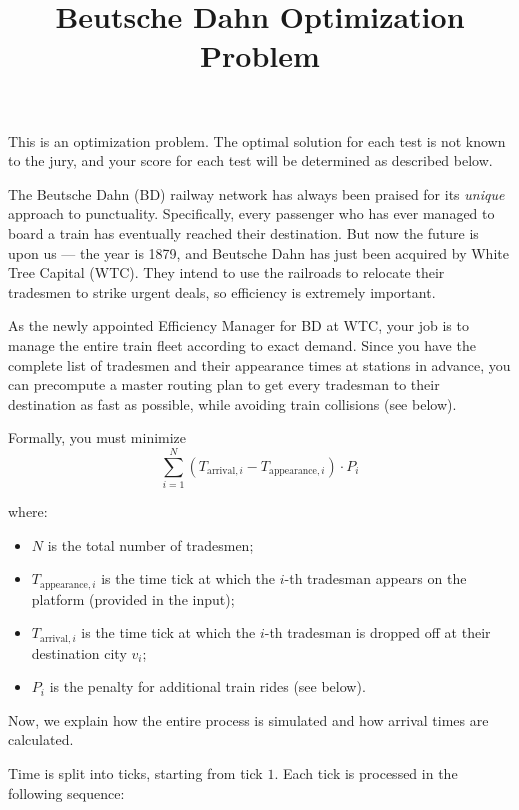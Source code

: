 \documentclass[11pt]{article}
\title{Beutsche Dahn Optimization Problem}
\date{}
\begin{document}
\maketitle

This is an optimization problem. The optimal solution for each test is not known to the jury, and your score for each test will be determined as described below.

The Beutsche Dahn (BD) railway network has always been praised for its \emph{unique} approach to punctuality. Specifically, every passenger who has ever managed to board a train has eventually reached their destination. But now the future is upon us --- the year is 1879, and Beutsche Dahn has just been acquired by White Tree Capital (WTC). They intend to use the railroads to relocate their tradesmen to strike urgent deals, so efficiency is extremely important.

As the newly appointed Efficiency Manager for BD at WTC, your job is to manage the entire train fleet according to exact demand. Since you have the complete list of tradesmen and their appearance times at stations in advance, you can precompute a master routing plan to get every tradesman to their destination as fast as possible, while avoiding train collisions (see below).

Formally, you must minimize
\[
\sum_{i=1}^{N} \left(T_{\text{arrival},i} - T_{\text{appearance},i}\right)\cdot P_i
\]

where:
\begin{itemize}
    \item $N$ is the total number of tradesmen;
    \item $T_{\text{appearance},i}$ is the time tick at which the $i$-th tradesman appears on the platform (provided in the input);
    \item $T_{\text{arrival},i}$ is the time tick at which the $i$-th tradesman is dropped off at their destination city $v_i$;
    \item $P_i$ is the penalty for additional train rides (see below).
\end{itemize}

Now, we explain how the entire process is simulated and how arrival times are calculated.

Time is split into ticks, starting from tick $1$. Each tick is processed in the following sequence:
\end{document}
